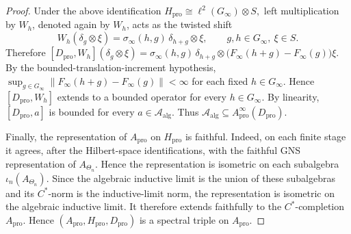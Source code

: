 \documentclass[11pt]{amsart}
\theoremstyle{definition}
\theoremstyle{remark}
\newcommand{\ex}{\mathrm{pro}}
\begin{document}
\begin{proof}
Under the above identification $H_\ex\cong\ell^2(G_\infty)\otimes S,$
left multiplication by $W_h$, denoted again by $W_h$, acts as the twisted
shift
\[
W_h(\delta_g\otimes\xi)
=\sigma_\infty(h,g)\,\delta_{h+g}\otimes\xi,
\qquad g,h\in G_\infty,\ \xi\in S.
\]
Therefore $[D_\ex,W_h](\delta_g\otimes\xi)=\sigma_\infty(h,g)\,\delta_{h+g}\otimes\bigl(F_\infty(h+g)-F_\infty(g)\bigr)\xi.$
By the bounded-translation-increment hypothesis, $\sup_{g\in G_\infty}\|F_\infty(h+g)-F_\infty(g)\|<\infty$
for each fixed $h\in G_\infty$. Hence $[D_\ex,W_h]$ extends to a bounded
operator for every $h\in G_\infty$. By linearity, $[D_\ex,a]$
is bounded for every $a\in\mathcal A_{\mathrm{alg}}$. Thus $
\mathcal A_{\mathrm{alg}}\subseteq A_{\ex}^{\infty}(D_{\ex})$.


Finally, the representation of $A_{\ex}$ on $H_{\ex}$ is faithful. Indeed, on each
finite stage it agrees, after the Hilbert-space identifications, with the
faithful GNS representation of $A_{\Theta_n}$. Hence the representation is
isometric on each subalgebra $\iota_n(A_{\Theta_n})$. Since the algebraic
inductive limit is the union of these subalgebras and its $C^*$-norm is the
inductive-limit norm, the representation is isometric on the algebraic
inductive limit. It therefore extends faithfully to the $C^*$-completion
$A_{\ex}$. Hence $(A_\ex,H_\ex,D_\ex)$
is a spectral triple on $A_\ex$.
\end{proof}
\end{document}
